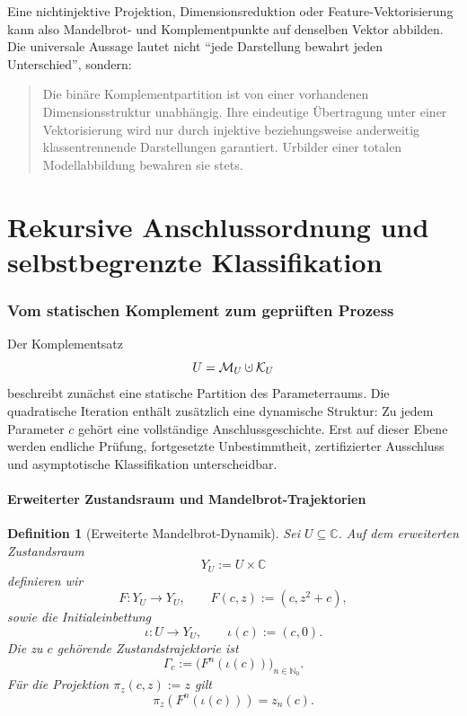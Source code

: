 \documentclass[11pt,a4paper]{article}
\newtheorem{definition}{Definition}[section]
\theoremstyle{remark}
\newcommand{\M}{\mathcal{M}}
\newcommand{\K}{\mathcal{K}}
\newcommand{\C}{\mathbb{C}}
\newcommand{\N}{\mathbb{N}}
\newcommand{\dotcup}{\mathbin{\mathaccent\cdot\cup}}
\begin{document}
Eine nichtinjektive Projektion, Dimensionsreduktion oder Feature-Vektorisierung
kann also Mandelbrot- und Komplementpunkte auf denselben Vektor abbilden. Die
universale Aussage lautet nicht ``jede Darstellung bewahrt jeden
Unterschied'', sondern:

\begin{quote}
Die binäre Komplementpartition ist von einer vorhandenen Dimensionsstruktur
unabhängig. Ihre eindeutige Übertragung unter einer Vektorisierung wird nur
durch injektive beziehungsweise anderweitig klassentrennende Darstellungen
garantiert. Urbilder einer totalen Modellabbildung bewahren sie stets.
\end{quote}

\part{Rekursive Anschlussordnung und selbstbegrenzte Klassifikation}

\section{Vom statischen Komplement zum geprüften Prozess}
\label{sec:dynamische-synthese}

Der Komplementsatz
\[
  U=\M_U\dotcup\K_U
\]
beschreibt zunächst eine statische Partition des Parameterraums. Die
quadratische Iteration enthält zusätzlich eine dynamische Struktur: Zu jedem
Parameter \(c\) gehört eine vollständige Anschlussgeschichte. Erst auf dieser
Ebene werden endliche Prüfung, fortgesetzte Unbestimmtheit, zertifizierter
Ausschluss und asymptotische Klassifikation unterscheidbar.

\subsection{Erweiterter Zustandsraum und Mandelbrot-Trajektorien}

\begin{definition}[Erweiterte Mandelbrot-Dynamik]
Sei \(U\subseteq\C\). Auf dem erweiterten Zustandsraum
\[
  Y_U:=U\times\C
\]
definieren wir
\[
  F:Y_U\longrightarrow Y_U,
  \qquad
  F(c,z):=(c,z^2+c),
\]
sowie die Initialeinbettung
\[
  \iota:U\longrightarrow Y_U,
  \qquad
  \iota(c):=(c,0).
\]
Die zu \(c\) gehörende Zustandstrajektorie ist
\[
  \Gamma_c:=\bigl(F^n(\iota(c))\bigr)_{n\in\N_0}.
\]
Für die Projektion \(\pi_z(c,z):=z\) gilt
\[
  \pi_z\!\left(F^n(\iota(c))\right)=z_n(c).
\]
\end{definition}
\end{document}
